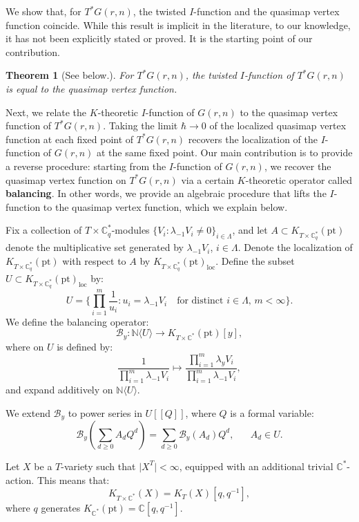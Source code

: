 \documentclass{amsart}
\newtheorem{thm}{Theorem}[section]
\begin{document}
We show that, for $T^*G(r,n)$, the twisted $I$-function and the quasimap vertex function coincide. While this result is implicit in the literature, to our knowledge, it has not been explicitly stated or proved. It is the starting point of our contribution.
\begin{thm}[See  below.]
    For $T^*G(r,n)$, the twisted $I$-function of $T^* G(r,n)$ is equal to the quasimap vertex function.
\end{thm}
 

Next, we relate the $K$-theoretic $I$-function of $G(r,n)$ to the quasimap vertex function of $T^*G(r,n)$. Taking the limit $\hbar \to 0$ of the localized quasimap vertex function at each fixed point of $T^*G(r,n)$ recovers the localization of the $I$-function of $G(r,n)$ at the same fixed point. Our main contribution is to provide a reverse procedure: starting from the $I$-function of $G(r,n)$, we recover the quasimap vertex function on $T^*G(r,n)$ via a certain $K$-theoretic operator called {\bf balancing}. In other words, we provide an algebraic procedure that lifts the $I$-function to the quasimap vertex function, which we explain below.

Fix a collection of  $T \times \mathbb{C}^*_q$-modules $\{V_i : \lambda_{-1}V_i \neq 0 \}_{i \in \Lambda}$, and let $A \subset K_{T \times \mathbb{C}^*_q}(\mathrm{pt})$ denote the multiplicative set generated by $\lambda_{-1}V_i$, $i \in \Lambda$. Denote the localization of $ K_{T \times \mathbb{C}^*_q}(\mathrm{pt})$ with respect to $A$ by $K_{T \times \mathbb{C}^*_q}(\mathrm{pt})_{\mathrm{loc}}$. Define the subset $U \subset K_{T \times \mathbb{C}^*_q}(\mathrm{pt})_{\mathrm{loc}}$ by:
\[
 U=\{\prod_{i=1}^m\frac{1}{u_i} : u_i =\lambda_{-1}V_i \quad \text{for distinct $i \in \Lambda$, $m < \infty$}\}.
 \]
 We define the balancing operator:
 \[
 \mathcal{B}_y : \mathbb{N}\langle U \rangle \to K_{T \times \mathbb{C}^*}(\mathrm{pt})[y],
 \]
  where on $U$ is defined by:
 \[
 \frac{1}{\prod_{i=1}^m\lambda_{-1}V_i} \mapsto  \frac{\prod_{i=1}^m\lambda_{y}V_i}{\prod_{i=1}^m\lambda_{-1}V_i},
 \]
and expand additively on $\mathbb{N}\langle U \rangle$.

 We extend $\mathcal{B}_y$ to power series in $U[[Q]]$, where $Q$ is a formal variable:
\[
\mathcal{B}_y(\sum_{d \geq 0}A_d Q^d) = \sum_{d\geq 0} \mathcal{B}_y(A_d) Q^d, \quad \text{ $A_d \in U$}.
\]
  
 Let $X$ be a $T$-variety such that $\big| X^T\big| < \infty$, equipped with an additional trivial $\mathbb{C}^*$-action. This means that:
 \[
 K_{T \times \mathbb{C}^*}(X) = K_T(X)[q,q^{-1}],
 \]
  where $q$ generates $K_{\mathbb{C}^*}(\mathrm{pt})=\mathbb{C}[q,q^{-1}]$.
\end{document}
